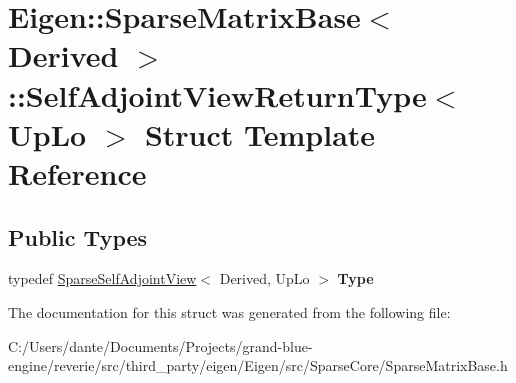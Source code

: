 \hypertarget{struct_eigen_1_1_sparse_matrix_base_1_1_self_adjoint_view_return_type}{}\section{Eigen\+::Sparse\+Matrix\+Base$<$ Derived $>$\+::Self\+Adjoint\+View\+Return\+Type$<$ Up\+Lo $>$ Struct Template Reference}
\label{struct_eigen_1_1_sparse_matrix_base_1_1_self_adjoint_view_return_type}
\subsection*{Public Types}
\begin{DoxyCompactItemize}
\item 
\mbox{\label{struct_eigen_1_1_sparse_matrix_base_1_1_self_adjoint_view_return_type_ae7adbe6e76b775017b2177ecccde88f8}} 
typedef \mbox{\hyperlink{class_eigen_1_1_sparse_self_adjoint_view}{Sparse\+Self\+Adjoint\+View}}$<$ Derived, Up\+Lo $>$ {\bfseries Type}
\end{DoxyCompactItemize}


The documentation for this struct was generated from the following file\+:\begin{DoxyCompactItemize}
\item 
C\+:/\+Users/dante/\+Documents/\+Projects/grand-\/blue-\/engine/reverie/src/third\+\_\+party/eigen/\+Eigen/src/\+Sparse\+Core/Sparse\+Matrix\+Base.\+h\end{DoxyCompactItemize}
